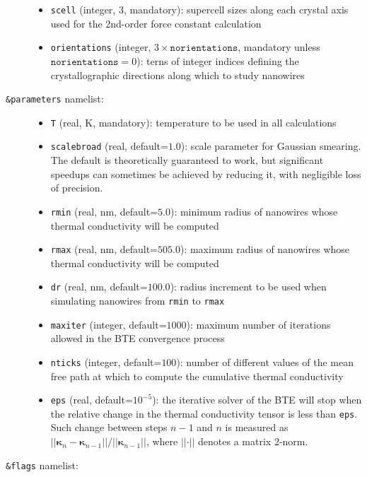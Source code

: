\documentclass[a4paper,10pt,english]{article}
\begin{document}
\begin{description}
\begin{itemize}
  \item\texttt{scell} (integer, $3$, mandatory): supercell sizes along each crystal axis used for the 2nd-order force constant calculation
  \item\texttt{orientations} (integer, $3\times\mathtt{norientations}$, mandatory unless $\mathtt{norientations}=0$): terns of integer indices defining the crystallographic directions along which to study nanowires
  \end{itemize}
\item[\texttt{\&parameters} namelist:]\hfill
  \begin{itemize}
    \item\texttt{T} (real, $\mathrm{K}$, mandatory): temperature to be used in all calculations
    \item\texttt{scalebroad} (real, default=$1.0$): scale parameter for Gaussian smearing. The default is theoretically guaranteed to work, but significant speedups can sometimes be achieved by reducing it, with negligible loss of precision.
    \item\texttt{rmin} (real, $\mathrm{nm}$, default=$5.0$): minimum radius of nanowires whose thermal conductivity will be computed
    \item\texttt{rmax} (real, $\mathrm{nm}$, default=$505.0$): maximum radius of nanowires whose thermal conductivity will be computed
    \item\texttt{dr} (real, $\mathrm{nm}$, default=$100.0$): radius increment to be used when simulating nanowires from \texttt{rmin} to \texttt{rmax}
    \item\texttt{maxiter} (integer, default=$1000$): maximum number of iterations allowed in the BTE convergence process
    \item\texttt{nticks} (integer, default=$100$): number of different values of the mean free path at which to compute the cumulative thermal conductivity
    \item\texttt{eps} (real, default=$10^{-5}$): the iterative solver of the BTE will stop when the relative change in the thermal conductivity tensor is less than \texttt{eps}. Such change between steps $n-1$ and $n$ is measured as $\left\vert\left\vert\mathbf{\kappa}_n-\mathbf{\kappa}_{n-1}\right\vert\right\vert/\left\vert\left\vert\mathbf{\kappa}_{n-1}\right\vert\right\vert$, where $\left\vert\left\vert\cdot\right\vert\right\vert$ denotes a matrix $2$-norm.
  \end{itemize}
\item[\texttt{\&flags} namelist:]\hfill
  \begin{itemize}

\end{itemize}
\end{description}
\end{document}
